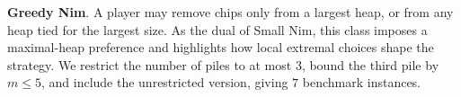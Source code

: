 \documentclass[review]{elsarticle}
\newcommand{\set}[1]{\{ #1 \}}
\newcommand{\tuple}[1]{\langle {#1} \rangle}
\newcommand{\true}{\top}
\newcommand{\statevar}{\mathcal{X}}
\newcommand{\act}{\mathcal{A}}
\newcommand{\constraint}{\mathcal{C}}
\newcommand{\estate}{\mathcal{E}}
\newcommand{\pre}{\mathtt{pre}}
\newcommand{\eff}{\mathtt{eff}}
\begin{document}
\textbf{Greedy Nim}. A player may remove chips only from a largest heap, or from any heap tied for the largest size.
As the dual of Small Nim, this class imposes a maximal-heap preference and highlights how local extremal choices shape the strategy.
We restrict the number of piles to at most $3$, bound the third pile by $m \le 5$, and include the unrestricted version, giving $7$ benchmark instances.
\end{document}
